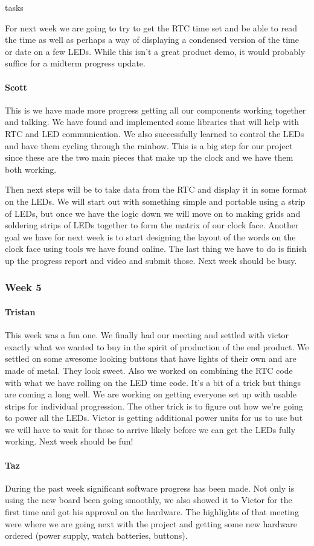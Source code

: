 tasks\documentclass[onecolumn, draftclsnofoot,10pt, compsoc]{IEEEtran}
\begin{document}
For next week we are going to try to get the RTC time set and be able to read the time as well as perhaps a way of displaying a condensed version of the time or date on a few LEDs. While this isn't a great product demo, it would probably suffice for a midterm progress update.
\paragraph{Scott}
This is we have made more progress getting all our components working together and talking. We have found and implemented some libraries that will help with RTC and LED communication. We also successfully learned to control the LEDs and have them cycling through the rainbow. This is a big step for our project since these are the two main pieces that make up the clock and we have them both working.

Then next steps will be to take data from the RTC and display it in some format on the LEDs. We will start out with something simple and portable using a strip of LEDs, but once we have the logic down we will move on to making grids and soldering strips of LEDs together to form the matrix of our clock face. Another goal we have for next week is to start designing the layout of the words on the clock face using tools we have found online. The last thing we have to do is finish up the progress report and video and submit those. Next week should be busy.
\subsubsection{Week 5}
\paragraph{Tristan}
This week was a fun one. We finally had our meeting and settled with victor exactly what we wanted to buy in the spirit of production of the end product. We settled on some awesome looking buttons that have lights of their own and are made of metal. They look sweet. Also we worked on combining the RTC code with what we have rolling on the LED time code. It's a bit of a trick but things are coming a long well. We are working on getting everyone set up with usable strips for individual progression. The other trick is to figure out how we're going to power all the LEDs. Victor is getting additional power units for us to use but we will have to wait for those to arrive likely before we can get the LEDs fully working. Next week should be fun!
\paragraph{Taz}
During the past week significant software progress has been made. Not only is using the new board been going smoothly, we also showed it to Victor for the first time and got his approval on the hardware. The highlights of that meeting were where we are going next with the project and getting some new hardware ordered (power supply, watch batteries, buttons).
\end{document}

